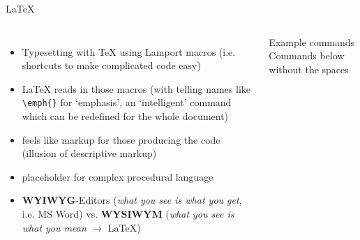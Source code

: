 \begin{frame}[fragile]{\LaTeX{}}

\begin{columns}
\small 
\begin{itemize}
    \item {} Typesetting with \TeX{} using Lamport macros (i.e. shortcuts to make complicated code easy)
\item \LaTeX{} reads in those macros (with telling names like \verb|\emph{}| for `emphasis', an `intelligent' command which can be redefined for the whole document)
\item feels like markup for those producing the code (illusion of descriptive markup)
\item placeholder for complex procedural language 
\item \textbf{WYIWYG}-Editors (\emph{what you see is what you get}, i.e. MS Word) vs. \textbf{WYSIWYM} (\emph{what you see is what you mean} $\to$ \LaTeX{}) 
\end{itemize}
\footnotesize
{}
\begin{block}{Example commands}
Commands below without the spaces \\
\end{block}
\end{columns}

\end{frame}


